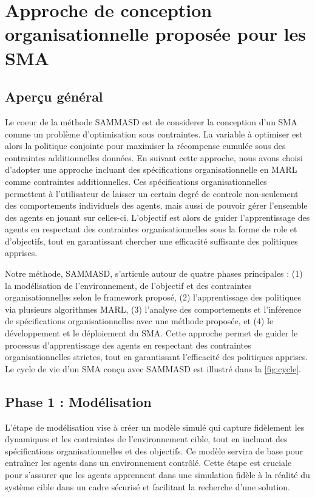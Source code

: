 \documentclass[sigconf,anonymous]{aamas}
\begin{document}
\section{Approche de conception organisationnelle proposée pour les SMA}
\label{sec:approach}

\subsection{Aperçu général}

Le coeur de la méthode SAMMASD est de considerer la conception d'un SMA comme un problème d'optimisation sous contraintes. La variable à optimiser est alors la politique conjointe pour maximiser la récompense cumulée sous des contraintes additionnelles données. En suivant cette approche, nous avons choisi d'adopter une approche incluant des spécifications organisationnelle en MARL comme contraintes additionnelles. Ces spécifications organisationnelles permettent à l'utilisateur de laisser un certain degré de controle non-seulement des comportements individuels des agents, mais aussi de pouvoir gérer l'ensemble des agents en jouant sur celles-ci.
L'objectif est alors de guider l'apprentissage des agents en respectant des contraintes organisationnelles sous la forme de role et d'objectifs, tout en garantissant chercher une efficacité suffisante des politiques apprises.

Notre méthode, SAMMASD, s'articule autour de quatre phases principales : (1) la modélisation de l'environnement, de l'objectif et des contraintes organisationnelles selon le framework proposé, (2) l'apprentissage des politiques via plusieurs algorithmes MARL, (3) l'analyse des comportements et l'inférence de spécifications organisationnelles avec une méthode proposée, et (4) le développement et le déploiement du SMA. Cette approche permet de guider le processus d'apprentissage des agents en respectant des contraintes organisationnelles strictes, tout en garantissant l'efficacité des politiques apprises. Le cycle de vie d'un SMA conçu avec SAMMASD est illustré dans la \autoref{fig:cycle}.


\subsection{Phase 1 : Modélisation}

L'étape de modélisation vise à créer un modèle simulé qui capture fidèlement les dynamiques et les contraintes de l'environnement cible, tout en incluant des spécifications organisationnelles et des objectifs. Ce modèle servira de base pour entraîner les agents dans un environnement contrôlé. Cette étape est cruciale pour s'assurer que les agents apprennent dans une simulation fidèle à la réalité du système cible dans un cadre sécurisé et facilitant la recherche d'une solution.
\end{document}
